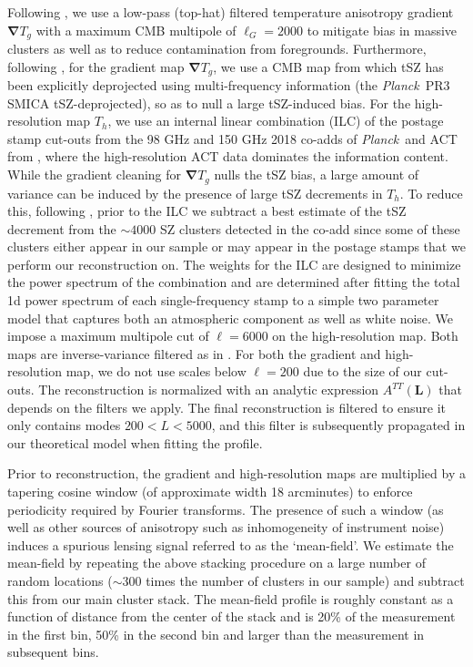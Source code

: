 \documentclass[preprint2]{aastex63}
\newcommand{\bL}{{\boldsymbol{L}}}
\newcommand{\Planck}{{\it Planck}}
\begin{document}
Following \cite{astro-ph/0701276}, we use a low-pass (top-hat) filtered temperature anisotropy gradient $\boldsymbol{\nabla}T_g$ with a maximum CMB multipole of $\ell_G=2000$ to mitigate bias in massive clusters as well as to reduce contamination from foregrounds. Furthermore, following \cite{1802.08230}, for the gradient map $\boldsymbol{\nabla}T_g$, we use a CMB map from which tSZ has been explicitly deprojected using multi-frequency information (the \Planck\ PR3 SMICA tSZ-deprojected), so as to null a large tSZ-induced bias. For the high-resolution map $T_h$, we use an internal linear combination (ILC) of the postage stamp cut-outs from the 98 GHz and 150 GHz 2018 co-adds of \Planck\ and ACT from \cite{2007.07290}, where the high-resolution ACT data dominates the information content. While the gradient cleaning for $\boldsymbol{\nabla}T_g$ nulls the tSZ bias, a large amount of variance can be induced by the presence of large tSZ decrements in $T_h$. To reduce this, following \cite{1905.07943}, prior to the ILC we subtract a best estimate of the tSZ decrement from the $\sim 4000$ SZ clusters detected in the co-add \citep{Hilton2020} since some of these clusters either appear in our sample or may appear in the postage stamps that we perform our reconstruction on.  The weights for the ILC are designed to minimize the power spectrum of the combination and are determined after fitting the total 1d power spectrum of each single-frequency stamp to a simple two parameter model that captures both an atmospheric component as well as white noise. We impose a maximum multipole cut of $\ell=6000$ on the high-resolution map.  Both maps are inverse-variance filtered as in \cite{astro-ph/0701276}. For both the gradient and high-resolution map, we do not use scales below $\ell=200$ due to the size of our cut-outs.
The reconstruction is normalized with an analytic expression $A^{TT}(\bL)$ \citep{astro-ph/0701276} that depends on the filters we apply. The final reconstruction is filtered to ensure it only contains modes $200 < L < 5000$, and this filter is subsequently propagated in our theoretical model when fitting the profile. 

Prior to reconstruction, the gradient and high-resolution maps are multiplied by a tapering cosine window (of approximate width 18 arcminutes) to enforce periodicity required by Fourier transforms. The presence of such a window (as well as other sources of anisotropy such as inhomogeneity of instrument noise) induces a spurious lensing signal referred to as the `mean-field'. We estimate the mean-field by repeating the above stacking procedure on a large number of random locations ($\sim 300$ times the number of clusters in our sample) and subtract this from our main cluster stack. The mean-field profile is roughly constant as a function of distance from the center of the stack and is 20\% of the measurement in the first bin, 50\% in the second bin and larger than the measurement in subsequent bins.
\end{document}
